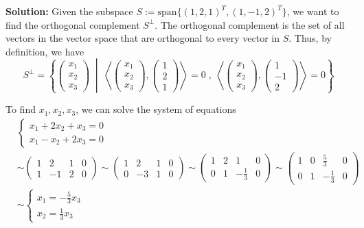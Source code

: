 \documentclass{article}
\begin{document}
\vspace{0.5cm}
\noindent\textbf{Solution:}
Given the subspace $S := \text{span} \{(1, 2, 1)^T, (1, -1, 2)^T\}$, we want to find the orthogonal complement $S^\perp$.
The orthogonal complement is the set of all vectors in the vector space that are orthogonal to every vector in $S$.
Thus, by definition, we have
$$ S^\perp = \left\{
    \begin{pmatrix} x_1 \\ x_2 \\ x_3 \end{pmatrix} 
    \; \middle| \; 
    \left\langle \begin{pmatrix} x_1 \\ x_2 \\ x_3 \end{pmatrix}, \begin{pmatrix} 1 \\ 2 \\ 1 \end{pmatrix} \right\rangle = 0 
    \; , \; 
    \left\langle \begin{pmatrix} x_1 \\ x_2 \\ x_3 \end{pmatrix}, \begin{pmatrix} 1 \\ -1 \\ 2 \end{pmatrix} \right\rangle = 0
\right\} $$

To find $x_1, x_2, x_3$, we can solve the system of equations
\begin{align*}
    &\begin{cases}
        x_1 + 2x_2 + x_3 = 0 \\
        x_1 - x_2 + 2x_3 = 0
    \end{cases} \\
    &\sim
    \left(\begin{array}{ccc|c} 
        1 & 2 & 1 & 0 \\
        1 & -1 & 2 & 0 
    \end{array}\right) \sim
    \left(\begin{array}{ccc|c} 
        1 & 2 & 1 & 0 \\
        0 & -3 & 1 & 0
    \end{array}\right) \sim
    \left(\begin{array}{ccc|c} 
        1 & 2 & 1 & 0 \\
        0 & 1 & -\frac{1}{3} & 0
    \end{array}\right) \sim
    \left(\begin{array}{ccc|c} 
        1 & 0 & \frac{5}{3} & 0 \\
        0 & 1 & -\frac{1}{3} & 0
    \end{array}\right) \\ &\sim
    \begin{cases}
        x_1 = -\frac{5}{3}x_3 \\
        x_2 = \frac{1}{3}x_3
    \end{cases}
\end{align*}
\end{document}
